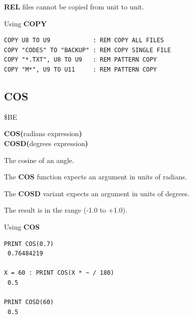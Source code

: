 \begin{description}[leftmargin=2cm,style=nextline]
                  {\bf REL} files cannot be copied from unit to unit.

\item [Examples:] Using {\bf COPY}

\begin{tcolorbox}[colback=black,coltext=white]
\verbatimfont{\codefont}
\begin{verbatim}
COPY U8 TO U9            : REM COPY ALL FILES
COPY "CODES" TO "BACKUP" : REM COPY SINGLE FILE
COPY "*.TXT", U8 TO U9   : REM PATTERN COPY
COPY "M*", U9 TO U11     : REM PATTERN COPY
\end{verbatim}
\end{tcolorbox}
\end{description}


\newpage
\subsection{COS}
\begin{description}[leftmargin=2cm,style=nextline]
\item [Token:]    \$BE

\item [Format:]   {\bf COS(}radians expression{\bf )} \\
                  {\bf COSD(}degrees expression{\bf )}

\item [Returns:]  The cosine of an angle.

                  The {\bf COS} function expects an argument in units of radians.

                  The {\bf COSD} variant expects an argument in units of degrees.

                  The result is in the range (-1.0 to +1.0).

\item [Examples:] Using {\bf COS}

\begin{tcolorbox}[colback=black,coltext=white]
\verbatimfont{\codefont}
\begin{verbatim}
PRINT COS(0.7)
 0.76484219

X = 60 : PRINT COS(X * ~ / 180)
 0.5

PRINT COSD(60)
 0.5
\end{verbatim}
\end{tcolorbox}
\end{description}

